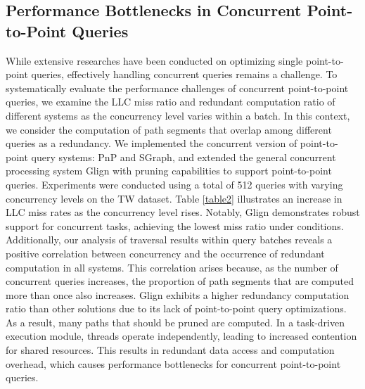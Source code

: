 \documentclass[10pt,journal,compsoc]{IEEEtran}
\begin{document}
\subsection{Performance Bottlenecks in Concurrent Point-to-Point Queries}\label{2.2}
While extensive researches have been conducted on optimizing single point-to-point queries, effectively handling concurrent queries remains a challenge. 
To systematically evaluate the performance challenges of concurrent point-to-point queries, we examine the LLC miss ratio and redundant computation ratio of different systems as the concurrency level varies within a batch. In this context, we consider the computation of path segments that overlap among different queries as a redundancy. We implemented the concurrent version of point-to-point query systems: PnP and SGraph, and extended the general concurrent processing system Glign with pruning capabilities to support point-to-point queries. Experiments were conducted using a total of 512 queries with varying concurrency levels on the TW dataset. 
Table \ref{table2} illustrates an increase in LLC miss rates as the concurrency level rises. Notably, Glign demonstrates robust support for concurrent tasks, achieving the lowest miss ratio under  conditions.
Additionally, our analysis of traversal results within query batches reveals a positive correlation between concurrency and the occurrence of redundant computation in all systems. This correlation arises because, as the number of concurrent queries increases, the proportion of path segments that are computed more than once also increases.
Glign exhibits a higher redundancy computation ratio than other solutions due to its lack of point-to-point query optimizations. As a result, many paths that should be pruned are computed.
In a task-driven execution module, threads operate independently, leading to increased contention for shared resources. This results in redundant data access and computation overhead, which causes performance bottlenecks for concurrent point-to-point queries.
\end{document}
